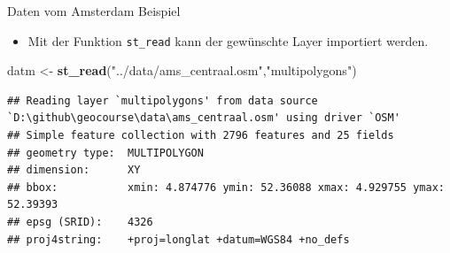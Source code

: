 \documentclass[ignorenonframetext,]{beamer}
\newenvironment{Shaded}{\begin{snugshade}}{\end{snugshade}}
\newcommand{\KeywordTok}[1]{\textcolor[rgb]{0.13,0.29,0.53}{\textbf{#1}}}
\newcommand{\NormalTok}[1]{#1}
\newcommand{\StringTok}[1]{\textcolor[rgb]{0.31,0.60,0.02}{#1}}
\providecommand{\tightlist}{%
  \setlength{\itemsep}{0pt}\setlength{\parskip}{0pt}}
\begin{document}
\begin{frame}[fragile]{Daten vom Amsterdam Beispiel}
\protect\hypertarget{daten-vom-amsterdam-beispiel}{}

\begin{itemize}
\tightlist
\item
  Mit der Funktion \texttt{st\_read} kann der gewünschte Layer
  importiert werden.
\end{itemize}

\begin{Shaded}
\begin{Highlighting}[]
\NormalTok{datm <-}\StringTok{ }\KeywordTok{st_read}\NormalTok{(}\StringTok{"../data/ams_centraal.osm"}\NormalTok{,}\StringTok{"multipolygons"}\NormalTok{)}
\end{Highlighting}
\end{Shaded}

\begin{verbatim}
## Reading layer `multipolygons' from data source `D:\github\geocourse\data\ams_centraal.osm' using driver `OSM'
## Simple feature collection with 2796 features and 25 fields
## geometry type:  MULTIPOLYGON
## dimension:      XY
## bbox:           xmin: 4.874776 ymin: 52.36088 xmax: 4.929755 ymax: 52.39393
## epsg (SRID):    4326
## proj4string:    +proj=longlat +datum=WGS84 +no_defs
\end{verbatim}

\end{frame}
\end{document}
